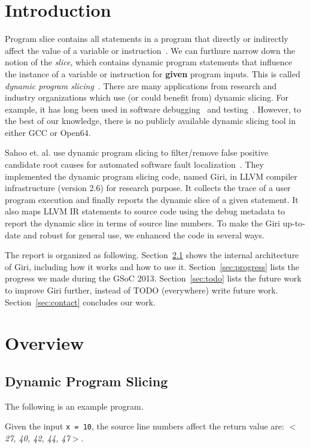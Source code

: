 \documentclass[DIV=calc, paper=a4, fontsize=11pt, twocolumn]{scrartcl}
\begin{document}
\section{Introduction}
Program slice contains all statements in a program that directly or indirectly affect the value of a variable or instruction~\cite{weiser}.
We can furthure narrow down the notion of the \emph{slice},
which contains dynamic program statements that influence the instance of a variable or instruction for \textbf{given} program inputs.
This is called \emph{dynamic program slicing}~\cite{agrawal1990dynamic}.
There are many applications from research and industry organizations which use (or could benefit from) dynamic slicing.
For example, it has long been used in software debugging~\cite{1993debugging,1999efficient} and testing~\cite{1993incremental}.
However, to the best of our knowledge, there is no publicly available dynamic slicing tool in either GCC or Open64.

Sahoo et. al. use dynamic program slicing to filter/remove false positive candidate root causes for automated software fault localization~\cite{sahoo2013asplos}.
They implemented the dynamic program slicing code, named Giri, in LLVM compiler infrastructure (version 2.6) for research purpose.
It collects the trace of a user program execution and finally reports the dynamic slice of a given statement.
It also maps LLVM IR statements to source code using the debug metadata to report the dynamic slice in terms of source line numbers.
To make the Giri up-to-date and robust for general use, we enhanced the code in several ways.

The report is organized as following.
Section~\ref{sec:overview} shows the internal architecture of Giri, including how it works and how to use it.
Section~\ref{sec:progress} lists the progress we made during the GSoC 2013.
Section~\ref{sec:todo} lists the future work to improve Giri further, instead of TODO (everywhere) write future work.
Section~\ref{sec:contact} concludes our work.

\section{Overview}
\subsection{Dynamic Program Slicing}
\label{sec:overview}
The following is an example program.

Given the input \texttt{x = 10}, the source line numbers affect the return value are: $<$\emph{27, 40, 42, 44, 47}$>$.
\end{document}
